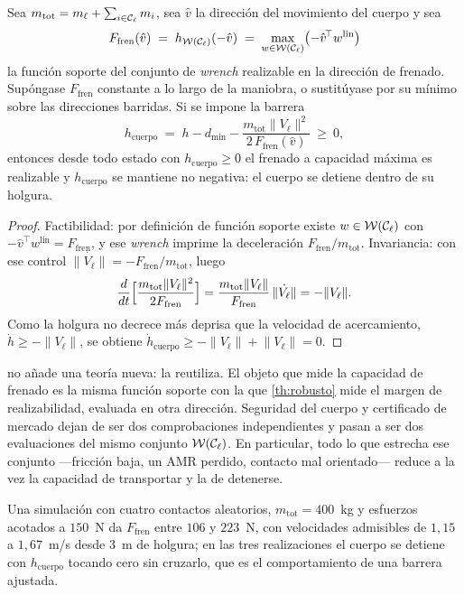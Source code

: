 \begin{teorema}
\label{th:astop-cuerpo}
Sea $m_{\mathrm{tot}}=m_\ell+\sum_{i\in\mathcal{C}_\ell}m_i$, sea $\hat v$ la dirección
del movimiento del cuerpo y sea
\[
  F_{\mathrm{fren}}(\hat v)\;=\;h_{\mathcal W(\mathcal{C}_\ell)}(-\hat v)
  \;=\;\max_{w\in\mathcal W(\mathcal{C}_\ell)}\bigl(-\hat v^{\!\top}w^{\mathrm{lin}}\bigr)
\]
la función soporte del conjunto de \emph{wrench} realizable en la dirección de
frenado. Supóngase $F_{\mathrm{fren}}$ constante a lo largo de la maniobra, o
sustitúyase por su mínimo sobre las direcciones barridas. Si se impone la barrera
\begin{equation}
  h_{\mathrm{cuerpo}}
  \;=\;h-d_{\min}-\frac{m_{\mathrm{tot}}\lVert V_\ell\rVert^{2}}
  {2\,F_{\mathrm{fren}}(\hat v)}\ \ge\ 0,
  \label{eq:barrera-cuerpo}
\end{equation}
entonces desde todo estado con $h_{\mathrm{cuerpo}}\ge0$ el frenado a capacidad
máxima es realizable y $h_{\mathrm{cuerpo}}$ se mantiene no negativa: el cuerpo
se detiene dentro de su holgura.
\end{teorema}

\begin{proof}
Factibilidad: por definición de función soporte existe
$w\in\mathcal W(\mathcal{C}_\ell)$ con $-\hat v^{\!\top}w^{\mathrm{lin}}=F_{\mathrm{fren}}$, y
ese \emph{wrench} imprime la deceleración $F_{\mathrm{fren}}/m_{\mathrm{tot}}$.
Invariancia: con ese control $\dot{\lVert V_\ell\rVert}=-F_{\mathrm{fren}}/m_{\mathrm{tot}}$,
luego
\[
  \frac{d}{dt}\Bigl[\frac{m_{\mathrm{tot}}\lVert V_\ell\rVert^{2}}{2F_{\mathrm{fren}}}\Bigr]
  =\frac{m_{\mathrm{tot}}\lVert V_\ell\rVert}{F_{\mathrm{fren}}}\,\dot{\lVert V_\ell\rVert}
  =-\lVert V_\ell\rVert .
\]
Como la holgura no decrece más deprisa que la velocidad de acercamiento,
$\dot h\ge-\lVert V_\ell\rVert$, se obtiene
$\dot h_{\mathrm{cuerpo}}\ge-\lVert V_\ell\rVert+\lVert V_\ell\rVert=0$.
\end{proof}

\begin{observacion}
\label{obs:frenado-soporte}
 no añade una teoría nueva: la reutiliza. El objeto que
mide la capacidad de frenado es la misma función soporte con la que
\cref{th:robusto} mide el margen de realizabilidad, evaluada en otra dirección.
Seguridad del cuerpo y certificado de mercado dejan de ser dos comprobaciones
independientes y pasan a ser dos evaluaciones del mismo conjunto
$\mathcal W(\mathcal{C}_\ell)$. En particular, todo lo que estrecha ese conjunto —fricción
baja, un AMR perdido, contacto mal orientado— reduce a la vez la capacidad de
transportar y la de detenerse.

Una simulación con cuatro contactos aleatorios, $m_{\mathrm{tot}}=400$~kg y
esfuerzos acotados a $150$~N da $F_{\mathrm{fren}}$ entre $106$ y $223$~N, con
velocidades admisibles de $1{,}15$ a $1{,}67$~m/s desde $3$~m de holgura; en las
tres realizaciones el cuerpo se detiene con $h_{\mathrm{cuerpo}}$ tocando cero
sin cruzarlo, que es el comportamiento de una barrera ajustada.
\end{observacion}

